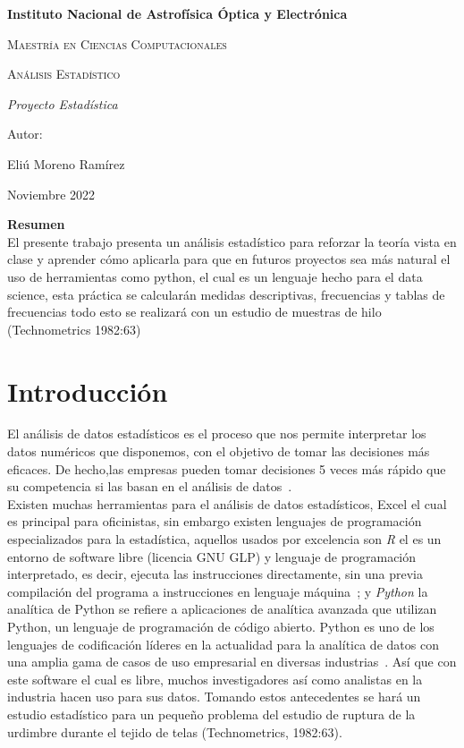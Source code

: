 \documentclass{report}
\begin{document}
%

\begin{titlepage}
\centering
{\bfseries\LARGE Instituto Nacional de Astrofísica Óptica y Electrónica \par}
\vspace{1cm}
{\scshape\Large Maestría en Ciencias Computacionales \par}
\vspace{3cm}
{\scshape\Huge Análisis Estadístico  \par}
\vspace{3cm}
{\itshape\Large Proyecto Estadística \par}
\vfill
{\Large Autor: \par}
{\Large Eliú Moreno Ramírez\par}
\vfill
{\Large Noviembre 2022 \par}
\end{titlepage}
%

%
%
%
\textbf{Resumen}\\
El presente trabajo presenta un análisis estadístico para reforzar la teoría vista en clase y aprender cómo aplicarla para que en futuros proyectos sea más natural el uso de herramientas como python, el cual es un lenguaje hecho para el data science, esta práctica se calcularán medidas descriptivas, frecuencias y tablas de frecuencias todo esto se realizará con un estudio de muestras de hilo (Technometrics 1982:63)
\section{Introducción}
El análisis de datos estadísticos es el proceso que nos permite interpretar los datos numéricos que disponemos, con el objetivo de tomar las decisiones más eficaces. De hecho,las empresas pueden tomar decisiones 5 veces más rápido que su competencia si las basan en el análisis de datos~\cite{ref_article0}.\\
Existen muchas herramientas para el análisis de datos estadísticos, Excel el cual es principal para oficinistas, sin embargo existen lenguajes de programación especializados para la estadística, aquellos usados por excelencia son \textit{R} el es un entorno de software libre (licencia GNU GLP) y lenguaje de programación interpretado, es decir, ejecuta las instrucciones directamente, sin una previa compilación del programa a instrucciones en lenguaje máquina~\cite{ref_article1}; y \textit{Python} la analítica de Python se refiere a aplicaciones de analítica avanzada que utilizan Python, un lenguaje de programación de código abierto. Python es uno de los lenguajes de codificación líderes en la actualidad para la analítica de datos con una amplia gama de casos de uso empresarial en diversas industrias~\cite{ref_article2}.
Así que con este software el cual es libre, muchos investigadores así como analistas en la industria hacen uso para sus datos. Tomando estos antecedentes se hará un estudio estadístico para un pequeño problema del estudio de ruptura de la urdimbre durante el tejido de telas (Technometrics, 1982:63).
\end{document}
